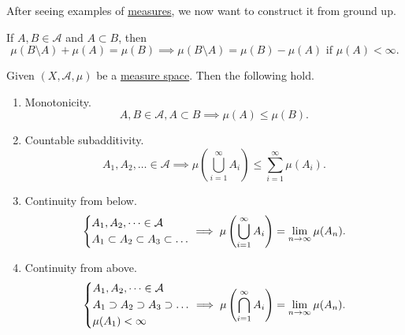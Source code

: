 After seeing examples of \hyperref[def:measure]{measures}, we now want to construct it from ground up.
\begin{note}
	If \(A, B\in \mathcal{A} \) and \(A\subset B\), then
	\[
		\mu(B\setminus A) + \mu(A) = \mu(B) \implies \mu(B \setminus A) = \mu(B) - \mu(A) \text{ if }\mu(A)<\infty.
	\]
\end{note}

\begin{theorem}\label{thm:measure-space}
	Given \((X, \mathcal{A} , \mu)\) be a \hyperref[def:measure-space]{measure space}. Then the following hold.
	\begin{enumerate}[(1)]
		\item \label{thm:measure-space-monotonicity}Monotonicity.
		      \[
			      A, B\in \mathcal{A} , A\subset B \implies \mu(A)\leq \mu(B).
		      \]
		\item \label{thm:measure-space-countable-subadditivity}Countable subadditivity.
		      \[
			      A_1, A_2, \dots \in \mathcal{A} \implies \mu\left(\bigcup_{i=1}^{\infty} A_{i}\right) \leq \sum_{i=1}^{\infty} \mu(A_{i}).
		      \]
		\item \label{thm:measure-space-continuity-from-below} Continuity from below.
		      \[
			      \begin{dcases}
				      A_1, A_2, \dots \in \mathcal{A} \\
				      A_1\subset A_2\subset A_3\subset \dots
			      \end{dcases} \implies \mu\left(\bigcup_{i=1}^{\infty} A_{i}\right) = \lim_{n \to \infty} \mu(A_{n}).
		      \]
		\item \label{thm:measure-space-continuity-from-above}Continuity from above.
		      \[
			      \begin{dcases}
				      A_1, A_2, \dots \in \mathcal{A}        \\
				      A_1\supset A_2\supset A_3\supset \dots \\
				      \mu(A_1) < \infty
			      \end{dcases} \implies \mu\left(\bigcap_{i=1}^{\infty} A_{i}\right) = \lim_{n \to \infty} \mu(A_{n}).
		      \]
	\end{enumerate}
\end{theorem}
